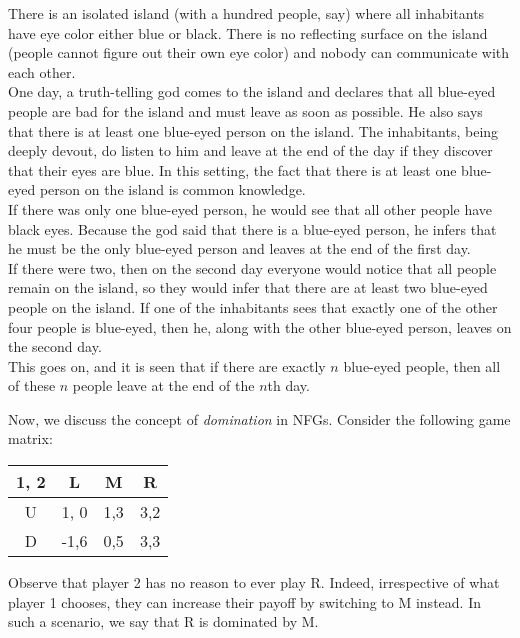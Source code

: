 	\begin{fex}
		There is an isolated island (with a hundred people, say) where all inhabitants have eye color either blue or black. There is no reflecting surface on the island (people cannot figure out their own eye color) and nobody can communicate with each other.\\
		One day, a truth-telling god comes to the island and declares that all blue-eyed people are bad for the island and must leave as soon as possible. He also says that there is at least one blue-eyed person on the island. The inhabitants, being deeply devout, do listen to him and leave at the end of the day if they discover that their eyes are blue. In this setting, the fact that there is at least one blue-eyed person on the island is common knowledge. \\

		If there was only one blue-eyed person, he would see that all other people have black eyes. Because the god said that there is a blue-eyed person, he infers that he must be the only blue-eyed person and leaves at the end of the first day.\\
		If there were two, then on the second day everyone would notice that all people remain on the island, so they would infer that there are at least two blue-eyed people on the island. If one of the inhabitants sees that exactly one of the other four people is blue-eyed, then he, along with the other blue-eyed person, leaves on the second day.\\
		This goes on, and it is seen that if there are exactly $n$ blue-eyed people, then all of these $n$ people leave at the end of the $n$th day.\\
	\end{fex}

	Now, we discuss the concept of \emph{domination} in NFGs. Consider the following game matrix:

	\begin{center}
	\begin{tabular}{|c||c|c|c|}
		\hline
		\textsf{1}, \textsf{2} & L & M & R \\
		\hline \hline
		U & 1, 0 & 1,3 & 3,2 \\
		\hline
		D & -1,6 & 0,5 & 3,3 \\
		\hline
	\end{tabular}
	\end{center}

	Observe that player \textsf{2} has no reason to ever play R. Indeed, irrespective of what player \textsf{1} chooses, they can increase their payoff by switching to M instead. In such a scenario, we say that R is dominated by M.\\

